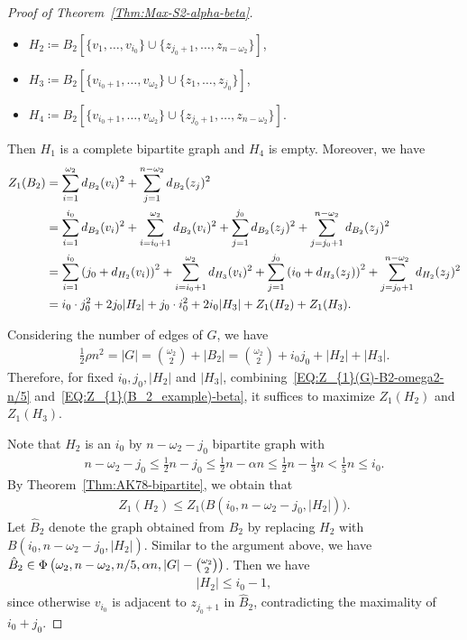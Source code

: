 \documentclass[11pt,a4paper]{article}
\begin{document}
\begin{proof}[Proof of Theorem~\ref{Thm:Max-S2-alpha-beta}]
\begin{itemize}
\item $H_2 \coloneqq B_2\left[\{v_1,\ldots, v_{i_0}\}\cup \{z_{j_0+1}, \ldots, z_{n-\omega_2}\}\right]$, 

\item $H_3 \coloneqq B_2\left[\{v_{i_0+1},\ldots, v_{\omega_2}\}\cup \{z_1, \ldots, z_{j_0}\}\right]$,

\item $H_4\coloneqq B_2\left[\{v_{i_0+1},\ldots, v_{\omega_2}\}\cup \{z_{j_0+1}, \ldots, z_{n-\omega_2}\}\right]$.  
\end{itemize}

Then $H_1$ is a complete bipartite graph and $H_4$ is empty. 
Moreover, we have 
\begin{align}\label{EQ:Z_{1}(B_2_example)-beta} 
Z_{1}(B_2) 
&= \sum_{i=1}^{\omega_2} d_{B_2}(v_i)^2 + \sum_{j=1}^{n-\omega_2} d_{B_2}(z_j)^2\notag \\
&= \sum_{i=1}^{i_0} d_{B_2}(v_i)^2 +\sum_{i=i_0+1}^{\omega_2} d_{B_2}(v_i)^2 + \sum_{j=1}^{j_0} d_{B_2}(z_j)^2+ \sum_{j=j_0+1}^{n-\omega_2} d_{B_2}(z_j)^2\notag \\
&= \sum_{i=1}^{i_0} \left(j_0+d_{H_2}(v_i)\right)^2+\sum_{i=i_0+1}^{\omega_2} d_{H_3}(v_i)^2+ \sum_{j=1}^{j_0} \left(i_0+d_{H_3}(z_j)\right)^2+ \sum_{j=j_0+1}^{n-\omega_2} d_{H_2}(z_j)^2\notag \\
& = i_0 \cdot j_0^2+ 2j_0 |H_2| + j_0 \cdot i_0^2+ 2i_0 |H_3|+Z_{1}(H_2) + Z_{1}(H_3). 
\end{align}

Considering the number of edges of $G$, 
we have 
\begin{align}\label{EQ:number-edges-G-H2-H3-n/5}
\frac{1}{2} \rho n^2
= |G| 
= \binom{\omega_2}{2} + |B_2|
= \binom{\omega_2}{2} + i_0 j_0 + |H_2| + |H_3|. 
\end{align}
Therefore, for fixed $i_0, j_0, |H_2|$ and $|H_3|$, combining~\eqref{EQ:Z_{1}(G)-B2-omega2-n/5} and~\eqref{EQ:Z_{1}(B_2_example)-beta}, it suffices to maximize $Z_{1}(H_2)$ and $Z_{1}(H_3)$. 

Note that $H_2$ is an $i_0$ by $n- \omega_2 -j_0$ bipartite graph with 
\begin{align*}
n- \omega_2 -j_0 
\le \frac{1}{2}n - j_0 
\le \frac{1}{2}n - \alpha n 
\le  \frac{1}{2}n - \frac{1}{3}n  
< \frac{1}{5}n
\le i_0. 
\end{align*}
By Theorem~\ref{Thm:AK78-bipartite}, we obtain that 
\begin{align}\label{EQ:beta-Z_1-H_2-graph-bound}
Z_{1}(H_2) 
\le Z_{1}\big(B(i_0,n- \omega_2 -j_0,|H_2|) \big). 
\end{align}
Let $\hat{B}_2$ denote the graph obtained from $B_2$ by replacing $H_2$ with $B(i_0,n- \omega_2 -j_0,|H_2|)$. 
Similar to the argument above, we have $\hat{B}_2 \in \Phi\left(\omega_2,n-\omega_2, n/5, \alpha n, |G|-\tbinom{\omega_2}{2}\right)$. 
Then we have 
\begin{align}\label{EQ:bound_H2}
|H_2| \le i_0 -1,    
\end{align}
since otherwise $v_{i_0}$ is adjacent to $z_{j_0+1}$ in $\hat{B}_2$, contradicting the maximality of $i_0 +j_0$. 


\end{proof}
\end{document}
